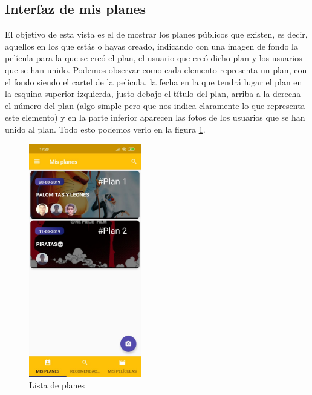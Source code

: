 \subsection{Interfaz de mis planes}
\label{makereference3.4.2}
El objetivo de esta vista es el de mostrar los planes públicos que existen, es decir, aquellos en los que estás o hayas creado, indicando con una imagen de fondo la película para la que se creó el plan, el usuario
que creó dicho plan y los usuarios que se han unido. 
Podemos observar como cada elemento representa un plan, con el fondo siendo el cartel de la película, la fecha en la que tendrá lugar el plan en la esquina superior izquierda,
justo debajo el título del plan, arriba a la derecha el número del plan (algo simple pero que nos indica
claramente lo que representa este elemento) y en la parte inferior aparecen las fotos de los usuarios que se han unido al plan.
Todo esto podemos verlo en la figura \ref{fig:listaPlanes}.
\begin{figure}[H]
    \centering
    \includegraphics[height=4in]{figures/plansList.jpg}
    \caption{Lista de planes}
    \label{fig:listaPlanes}
\end{figure}

